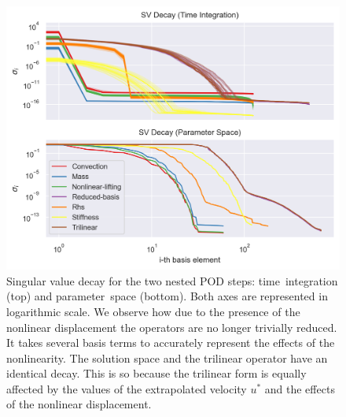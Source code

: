 \documentclass[../../thesis.tex]{subfiles}
\begin{document}
\begin{figure}[h]
    \includegraphics[width =\columnwidth]{research_project/piston/figures/nonlinear_displacement/separable/sigmas_loglog.png}
    \caption{Singular value decay for the two nested POD steps: 
    \mbox{time integration} (top) and \mbox{parameter space} (bottom).
    Both axes are represented in logarithmic scale.
    We observe how due to the presence of the nonlinear displacement
    the operators are no longer trivially reduced.
    It takes several basis terms to accurately represent 
    the effects of the nonlinearity.
    The solution space and the trilinear operator have an identical decay.
    This is so because the trilinear form is equally affected by the 
    values of the extrapolated velocity $u^{*}$ 
    and the effects of the nonlinear displacement.}
    \label{fig:nlinear_disp_sep_loglog}
\end{figure}
\end{document}
